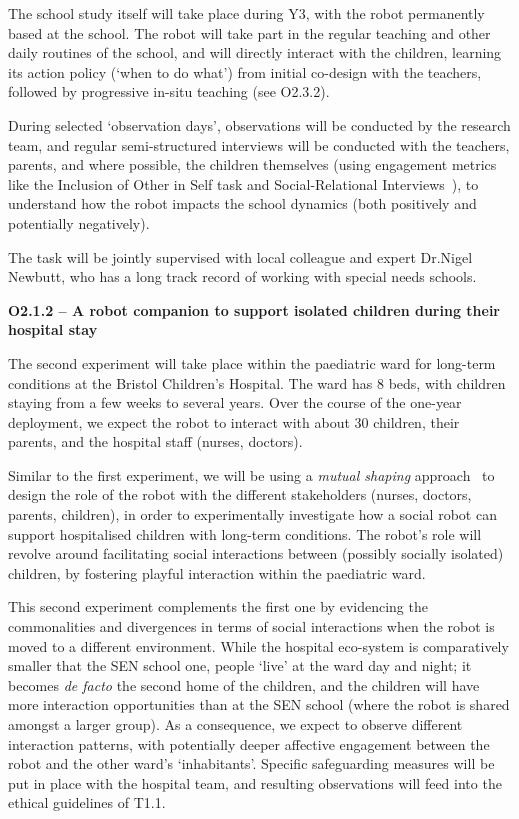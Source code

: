 \begin{rewrite}

The school study itself will take place during Y3, with the robot permanently
based at the school. The robot will take part in the
regular teaching and other daily routines of the school, and will directly
interact with the children, learning its action policy (`when to do what') from
initial co-design with the teachers, followed by progressive in-situ teaching (see
O2.3.2).

During selected `observation days', observations will be conducted by the
research team, and regular semi-structured interviews will be conducted with the
teachers, parents, and where possible, the children themselves (using engagement
metrics like the Inclusion of Other in Self task and Social-Relational
Interviews~\cite{westlund2017measuring}), to understand how the robot impacts
the school dynamics  (both positively and potentially negatively).

The task will be jointly supervised with local colleague and expert Dr.Nigel Newbutt,
who has a long track record of working with special needs schools.

\textbf{O2.1.2 -- A robot companion to support isolated children during their
hospital stay}

The second experiment will take place within the paediatric ward for long-term
conditions at the Bristol Children's Hospital. The ward has 8 beds, with
children staying from a few weeks to several years. Over the course of the
one-year deployment, we expect the robot to interact with about 30 children,
their parents, and the hospital staff (nurses, doctors).

Similar to the first experiment, we will be using a \emph{mutual shaping}
approach~\cite{winkle2018social} to design the role of the robot with the
different stakeholders (nurses, doctors, parents, children), in order to
experimentally investigate how a social robot can support hospitalised children
with long-term conditions. The robot's role will revolve around facilitating
social interactions between (possibly socially isolated) children, by fostering
playful interaction within the paediatric ward.

This second experiment complements the first one by evidencing the commonalities
and divergences in terms of social interactions when the robot is moved to a
different environment. While the hospital eco-system is comparatively smaller that the SEN school one,
people `live' at the ward day and night; it becomes \emph{de facto} the second home of the
children, and the children will have more interaction opportunities than at the
SEN school (where the robot is shared amongst a larger group). As a consequence,
we expect to observe different interaction patterns, with potentially deeper
affective engagement between the robot and the other ward's `inhabitants'.
Specific safeguarding measures will be put in place with the hospital team, and
resulting observations will feed into the ethical guidelines of T1.1.


\end{rewrite}
